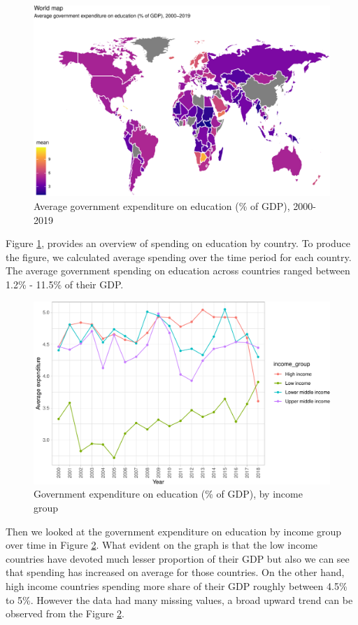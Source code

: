 \documentclass[11pt,a4paper,]{article}
\begin{document}
\begin{figure}
\centering
\includegraphics{report_files/figure-latex/plot1zb-1.pdf}
\caption{\label{fig:plot1zb}Average government expenditure on education (\% of GDP), 2000-2019}
\end{figure}

Figure \ref{fig:plot1zb}, provides an overview of spending on education by country. To produce the figure, we calculated average spending over the time period for each country. The average government spending on education across countries ranged between 1.2\% - 11.5\% of their GDP.

\begin{figure}
\centering
\includegraphics{report_files/figure-latex/plot2-zb-1.pdf}
\caption{\label{fig:plot2-zb}Government expenditure on education (\% of GDP), by income group}
\end{figure}

Then we looked at the government expenditure on education by income group over time in Figure \ref{fig:plot2-zb}. What evident on the graph is that the low income countries have devoted much lesser proportion of their GDP but also we can see that spending has increased on average for those countries. On the other hand, high income countries spending more share of their GDP roughly between 4.5\% to 5\%. However the data had many missing values, a broad upward trend can be observed from the Figure \ref{fig:plot2-zb}.
\end{document}
